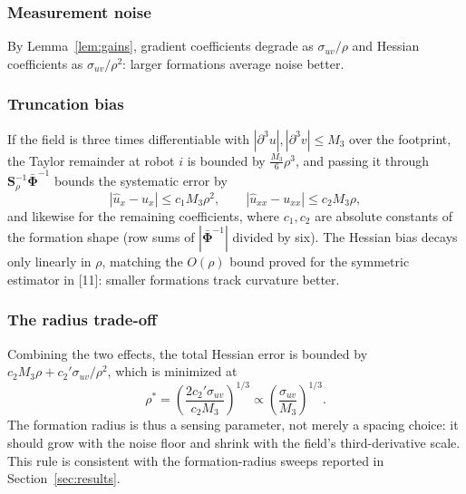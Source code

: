 \documentclass[lettersize,journal]{IEEEtran}
\begin{document}
\subsubsection{Measurement noise}
By Lemma~\ref{lem:gains}, gradient coefficients degrade as
$\sigma_{uv}/\rho$ and Hessian coefficients as $\sigma_{uv}/\rho^2$:
larger formations average noise better.

\subsubsection{Truncation bias}
If the field is three times differentiable with
$|\partial^3 u|, |\partial^3 v| \leq M_3$ over the footprint, the Taylor
remainder at robot $i$ is bounded by $\tfrac{M_3}{6}\rho^3$, and passing
it through $\mathbf{S}_\rho^{-1}\bar{\boldsymbol{\Phi}}^{-1}$ bounds the
systematic error by
\begin{equation}
    |\hat{u}_x - u_x| \leq c_1 M_3 \rho^2, \qquad
    |\hat{u}_{xx} - u_{xx}| \leq c_2 M_3 \rho,
    \label{eq:truncation}
\end{equation}
and likewise for the remaining coefficients, where $c_1, c_2$ are
absolute constants of the formation shape (row sums of
$|\bar{\boldsymbol{\Phi}}^{-1}|$ divided by six). The Hessian bias decays
only linearly in $\rho$, matching the $O(\rho)$ bound proved for the
symmetric estimator in [11]: smaller formations track curvature better.

\subsubsection{The radius trade-off}
Combining the two effects, the total Hessian error is bounded by
$c_2 M_3 \rho + c_2' \sigma_{uv}/\rho^2$, which is minimized at
\begin{equation}
    \rho^* = \left(\frac{2 c_2' \sigma_{uv}}{c_2 M_3}\right)^{1/3}
    \propto \left(\frac{\sigma_{uv}}{M_3}\right)^{1/3}.
    \label{eq:rho_star}
\end{equation}
The formation radius is thus a sensing parameter, not merely a spacing
choice: it should grow with the noise floor and shrink with the field's
third-derivative scale. This rule is consistent with the formation-radius
sweeps reported in Section~\ref{sec:results}.
\end{document}
